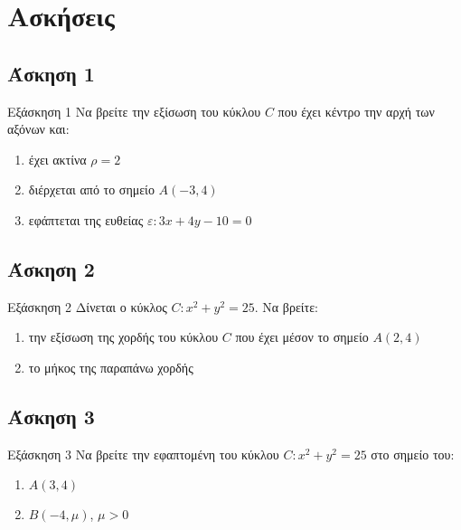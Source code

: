 \documentclass[greek]{beamer}
\begin{document}
\section{Ασκήσεις}
\subsection{Άσκηση 1}
\begin{frame}[label=Άσκηση1,t]{Εξάσκηση 1}
 Να βρείτε την εξίσωση του κύκλου $C$ που έχει κέντρο την αρχή των αξόνων και:
 \begin{enumerate}
  \item<1-> έχει ακτίνα $ρ=2$
  \item<2-> διέρχεται από το σημείο $Α(-3,4)$
  \item<3-> εφάπτεται της ευθείας $ε:3x+4y-10=0$
 \end{enumerate}

\end{frame}

\subsection{Άσκηση 2}
\begin{frame}[label=Άσκηση2,t]{Εξάσκηση 2}
 Δίνεται ο κύκλος $C:x^2+y^2=25$. Να βρείτε:
 \begin{enumerate}
  \item<1-> την εξίσωση της χορδής του κύκλου $C$ που έχει μέσον το σημείο $Α(2,4)$
  \item<2-> το μήκος της παραπάνω χορδής
 \end{enumerate}

\end{frame}

\subsection{Άσκηση 3}
\begin{frame}[label=Άσκηση3,t]{Εξάσκηση 3}
 Να βρείτε την εφαπτομένη του κύκλου $C:x^2+y^2=25$ στο σημείο του:
 \begin{enumerate}
  \item<1-> $Α(3,4)$
  \item<2-> $Β(-4,μ)$, $μ>0$
 \end{enumerate}

\end{frame}
\end{document}
